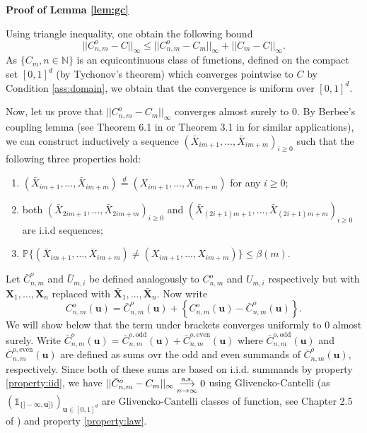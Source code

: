 \documentclass[11pt]{article}
\makeatletter
\theoremstyle{definition}
\renewenvironment{proof}[1][\proofname]{\par
\pushQED{\qed}%
\normalfont \topsep6\p@\@plus6\p@\relax
\trivlist
\item\relax
{\textbf{
#1\@addpunct{ }}}\hspace\labelsep\ignorespaces
}{%
\popQED\endtrivlist\@endpefalse
}
\makeatother
\begin{document}
	\begin{proof}[Proof of Lemma \ref{lem:gc}]
		Using triangle inequality, one obtain the following bound
		\begin{equation*}
			||C_{n,m}^o - C ||_{\infty} \leq ||C_{n,m}^o - C_m ||_{\infty} + ||C_m - C ||_{\infty}.
		\end{equation*}
		As $\{C_m, n \in \mathbb{N}\}$ is an equicontinuous class of functions, defined on the compact set $[0,1]^d$ (by Tychonov's theorem) which converges pointwise to $C$ by Condition \ref{ass:domain}, we obtain that the convergence is uniform over $[0,1]^d$.
		
		Now, let us prove that $||C_{n,m}^o - C_m ||_{\infty}$ converges almost surely to $0$. By Berbee's coupling lemma (see Theorem 6.1  in \cite{rio2017asymptotic} or Theorem 3.1 in \cite{bucher2014extreme} for similar applications), we can construct inductively a sequence $(\bar{X}_{im+1},\dots, \bar{X}_{im+m})_{i \geq 0}$ such that the following three properties hold:
		\begin{enumerate}[label=(\roman*)]
			\item $(\bar{X}_{im+1},\dots, \bar{X}_{im+m}) \overset{d}{=} (X_{im+1},\dots, X_{im+m})$ for any $i \geq 0$; \label{property:law}
			\item both $(\bar{X}_{2im+1},\dots, \bar{X}_{2im+m})_{i\geq 0}$ and $(\bar{X}_{(2i+1)m+1},\dots, \bar{X}_{(2i+1)m+m})_{i\geq 0}$ are i.i.d sequences; \label{property:iid}
			\item $\mathbb{P}\{(\bar{X}_{im+1},\dots, \bar{X}_{im+m}) \neq (X_{im+1}, \dots, X_{im+m}) \} \leq \beta(m)$. \label{property:mixing}
		\end{enumerate}
		Let $\bar{C}_{n,m}^o$ and $\bar{U}_{m,i}$ be defined analogously to $C_{n,m}^o$ and $U_{m,i}$ respectively but with $\textbf{X}_1,\dots, \textbf{X}_n$ replaced with $\bar{\textbf{X}}_1,\dots, \bar{\textbf{X}}_n$. Now write
		\begin{equation}
			\label{eq:coupling}
			C_{n,m}^o(\textbf{u}) = \bar{C}_{n,m}^o(\textbf{u}) + \left\{ C_{n,m}^o(\textbf{u}) - \bar{C}_{n,m}^o(\textbf{u}) \right\}.
		\end{equation}
		We will show below that the term under brackets converges uniformly to $0$ almost surely. Write $\bar{C}_{n,m}^o(\textbf{u}) = \bar{C}_{n,m}^{o,\textrm{odd}}(\textbf{u}) + \bar{C}_{n,m}^{o,\textrm{even}}(\textbf{u})$ where $\bar{C}_{n,m}^{o,\textrm{odd}}(\textbf{u})$ and $\bar{C}_{n,m}^{o,\textrm{even}}(\textbf{u})$ are defined as sums ovr the odd and even summands of $\bar{C}_{n,m}^o(\textbf{u})$, respectively. Since both of these sums are based on i.i.d. summands by property \ref{property:iid}, we have $||\bar{C}^o_{n,m} - C_m ||_{\infty} \overunderset{\textrm{a.s.}}{n \rightarrow \infty}{\longrightarrow} 0$ using Glivencko-Cantelli (as $(\mathds{1}_{\{ ]-\infty, \textbf{u}] \}})_{\textbf{u} \in [0,1]^d}$ are Glivencko-Cantelli classes of function, see Chapter 2.5 of \cite{bestbook}) and property \ref{property:law}.
		

\end{proof}
\end{document}
